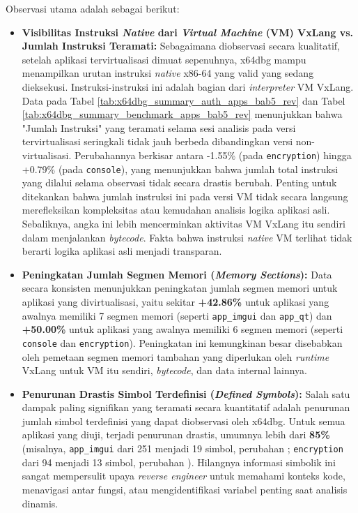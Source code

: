 Observasi utama adalah sebagai berikut:
\begin{itemize}
    \item \textbf{Visibilitas Instruksi \textit{Native} dari \textit{Virtual Machine} (VM) VxLang vs. Jumlah Instruksi Teramati:}
    Sebagaimana diobservasi secara kualitatif, setelah aplikasi tervirtualisasi dimuat sepenuhnya, x64dbg mampu menampilkan urutan instruksi \textit{native} x86-64 yang valid yang sedang dieksekusi. Instruksi-instruksi ini adalah bagian dari \textit{interpreter} VM VxLang. Data pada Tabel \ref{tab:x64dbg_summary_auth_apps_bab5_rev} dan Tabel \ref{tab:x64dbg_summary_benchmark_apps_bab5_rev} menunjukkan bahwa "Jumlah Instruksi" yang teramati selama sesi analisis pada versi tervirtualisasi seringkali tidak jauh berbeda dibandingkan versi non-virtualisasi. Perubahannya berkisar antara -1.55\% (pada \texttt{encryption}) hingga +0.79\% (pada \texttt{console}), yang menunjukkan bahwa jumlah total instruksi yang dilalui selama observasi tidak secara drastis berubah.
    Penting untuk ditekankan bahwa jumlah instruksi ini pada versi VM tidak secara langsung merefleksikan kompleksitas atau kemudahan analisis logika aplikasi asli. Sebaliknya, angka ini lebih mencerminkan aktivitas VM VxLang itu sendiri dalam menjalankan \textit{bytecode}. Fakta bahwa instruksi \textit{native} VM terlihat tidak berarti logika aplikasi asli menjadi transparan.

    \item \textbf{Peningkatan Jumlah Segmen Memori (\textit{Memory Sections}):}
    Data secara konsisten menunjukkan peningkatan jumlah segmen memori untuk aplikasi yang divirtualisasi, yaitu sekitar \textbf{+42.86\%} untuk aplikasi yang awalnya memiliki 7 segmen memori (seperti \texttt{app\_imgui} dan \texttt{app\_qt}) dan \textbf{+50.00\%} untuk aplikasi yang awalnya memiliki 6 segmen memori (seperti \texttt{console} dan \texttt{encryption}). Peningkatan ini kemungkinan besar disebabkan oleh pemetaan segmen memori tambahan yang diperlukan oleh \textit{runtime} VxLang untuk VM itu sendiri, \textit{bytecode}, dan data internal lainnya.

    \item \textbf{Penurunan Drastis Simbol Terdefinisi (\textit{Defined Symbols}):}
    Salah satu dampak paling signifikan yang teramati secara kuantitatif adalah penurunan jumlah simbol terdefinisi yang dapat diobservasi oleh x64dbg. Untuk semua aplikasi yang diuji, terjadi penurunan drastis, umumnya lebih dari \textbf{85\%} (misalnya, \texttt{app\_imgui} dari 251 menjadi 19 simbol, perubahan ; \texttt{encryption} dari 94 menjadi 13 simbol, perubahan ). Hilangnya informasi simbolik ini sangat mempersulit upaya \textit{reverse engineer} untuk memahami konteks kode, menavigasi antar fungsi, atau mengidentifikasi variabel penting saat analisis dinamis.


\end{itemize}
